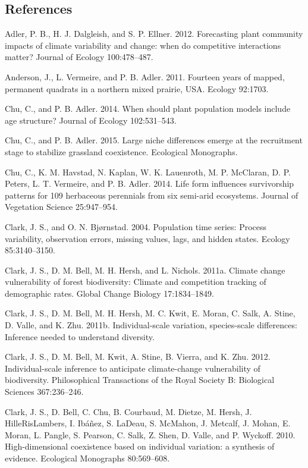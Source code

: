 \documentclass[12pt,]{article}
\begin{document}
\subsection{References}\label{references}

Adler, P. B., H. J. Dalgleish, and S. P. Ellner. 2012. Forecasting plant
community impacts of climate variability and change: when do competitive
interactions matter? Journal of Ecology 100:478--487.

Anderson, J., L. Vermeire, and P. B. Adler. 2011. Fourteen years of
mapped, permanent quadrats in a northern mixed prairie, USA. Ecology
92:1703.

Chu, C., and P. B. Adler. 2014. When should plant population models
include age structure? Journal of Ecology 102:531--543.

Chu, C., and P. B. Adler. 2015. Large niche differences emerge at the
recruitment stage to stabilize grassland coexistence. Ecological
Monographs.

Chu, C., K. M. Havstad, N. Kaplan, W. K. Lauenroth, M. P. McClaran, D.
P. Peters, L. T. Vermeire, and P. B. Adler. 2014. Life form influences
survivorship patterns for 109 herbaceous perennials from six semi-arid
ecosystems. Journal of Vegetation Science 25:947--954.

Clark, J. S., and O. N. Bjørnstad. 2004. Population time series: Process
variability, observation errors, missing values, lags, and hidden
states. Ecology 85:3140--3150.

Clark, J. S., D. M. Bell, M. H. Hersh, and L. Nichols. 2011a. Climate
change vulnerability of forest biodiversity: Climate and competition
tracking of demographic rates. Global Change Biology 17:1834--1849.

Clark, J. S., D. M. Bell, M. H. Hersh, M. C. Kwit, E. Moran, C. Salk, A.
Stine, D. Valle, and K. Zhu. 2011b. Individual-scale variation,
species-scale differences: Inference needed to understand diversity.

Clark, J. S., D. M. Bell, M. Kwit, A. Stine, B. Vierra, and K. Zhu.
2012. Individual-scale inference to anticipate climate-change
vulnerability of biodiversity. Philosophical Transactions of the Royal
Society B: Biological Sciences 367:236--246.

Clark, J. S., D. Bell, C. Chu, B. Courbaud, M. Dietze, M. Hersh, J.
HilleRisLambers, I. Ibáñez, S. LaDeau, S. McMahon, J. Metcalf, J. Mohan,
E. Moran, L. Pangle, S. Pearson, C. Salk, Z. Shen, D. Valle, and P.
Wyckoff. 2010. High-dimensional coexistence based on individual
variation: a synthesis of evidence. Ecological Monographs 80:569--608.
\end{document}
